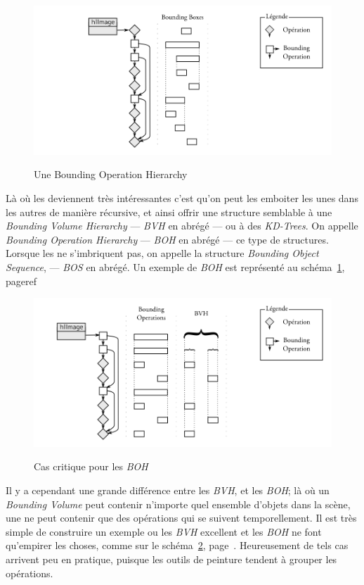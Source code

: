 		\begin{figure}[ht]
			\centering
			\includegraphics[width=\textwidth]{images/bo2} 
			\label{fig:bo2}
			\caption{Une Bounding Operation Hierarchy}
		\end{figure}

		Là où les \BO deviennent très intéressantes c'est qu'on peut les emboiter les unes dans les
		autres de manière récursive, et ainsi offrir une structure semblable à une \emph{Bounding Volume Hierarchy} 
		--- \emph{BVH} en abrégé --- ou à des \emph{KD-Trees}. On appelle \emph{Bounding Operation Hierarchy} --- \emph{BOH}
		en abrégé --- ce type de structures. Lorsque les \BO ne s'imbriquent pas, on appelle la structure \emph{Bounding Object Sequence},
		--- \emph{BOS} en abrégé. Un exemple de \emph{BOH} est représenté au schéma~\ref{fig:bo2}, pageref~\pageref{fig:bo2} 

		\begin{figure}[ht]
			\centering
			\includegraphics[width=\textwidth]{images/bo3} 
			\label{fig:bo3}
			\caption{Cas critique pour les \emph{BOH}}
		\end{figure}
		Il y a cependant une grande différence entre les \emph{BVH}, et les \emph{BOH}; là où un \emph{Bounding Volume}
		peut contenir n'importe quel ensemble
		d'objets dans la scène, une \BO ne peut contenir que des opérations qui se suivent temporellement. Il
		est très simple de construire un exemple ou les \emph{BVH} excellent et les \emph{BOH} ne font qu'empirer
		les choses, comme sur le schéma~\ref{fig:bo3}, page~\pageref{fig:bo3}. Heureusement de tels cas arrivent peu 
		en pratique, puisque les outils de peinture tendent à grouper les opérations.

